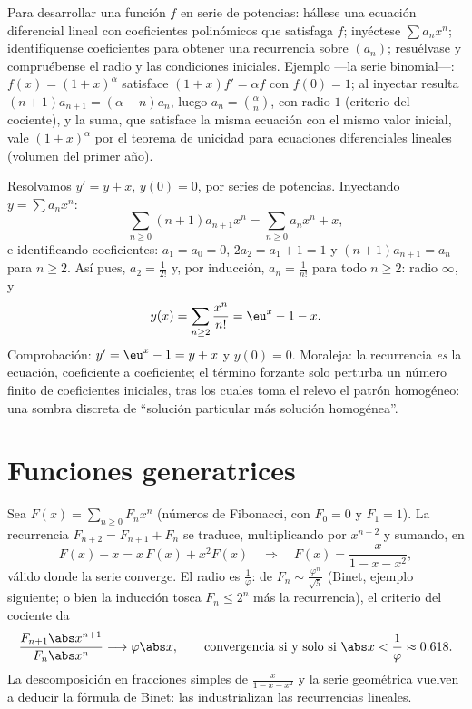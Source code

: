\begin{method}\label{met:b2:powerseries:ode}
Para desarrollar una función $f$ en serie de potencias: hállese una
ecuación diferencial lineal con coeficientes polinómicos que
satisfaga $f$; inyéctese $\sum a_nx^n$; identifíquense coeficientes
para obtener una recurrencia sobre $(a_n)$; resuélvase y
compruébense el radio y las condiciones iniciales. Ejemplo ---la
serie binomial---: $f(x) = (1+x)^\alpha$ satisface $(1+x)f' = \alpha
f$ con $f(0) = 1$; al inyectar resulta $(n+1)a_{n+1} = (\alpha -
n)a_n$, luego $a_n = \binom{\alpha}{n}$, con radio $1$ (criterio del
cociente), y la suma, que satisface la misma ecuación con el mismo
valor inicial, vale $(1 + x)^\alpha$ por el teorema de unicidad para
ecuaciones diferenciales lineales (volumen del primer año).
\end{method}

\begin{example}\label{ex:b2:powerseries:odeforced}
Resolvamos $y' = y + x$, $y(0) = 0$, por series de potencias.
Inyectando $y = \sum a_nx^n$:
\[
\sum_{n\geq0}(n+1)a_{n+1}x^n
= \sum_{n\geq0}a_nx^n + x ,
\]
e identificando coeficientes: $a_1 = a_0 = 0$, $2a_2 = a_1 + 1 = 1$
y $(n+1)a_{n+1} = a_n$ para $n \geq 2$. Así pues, $a_2 =
\frac{1}{2!}$ y, por inducción, $a_n = \frac{1}{n!}$ para todo $n
\geq 2$: radio $\infty$, y
\[
y(x) = \sum_{n\geq2}\frac{x^n}{n!} = \eu^x - 1 - x .
\]
Comprobación: $y' = \eu^x - 1 = y + x$ y $y(0) = 0$. Moraleja: la
recurrencia \emph{es} la ecuación, coeficiente a coeficiente; el
término forzante solo perturba un número finito de coeficientes
iniciales, tras los cuales toma el relevo el patrón homogéneo: una
sombra discreta de ``solución particular más solución homogénea''.
\end{example}

\section{Funciones generatrices}

\begin{example}[Fibonacci]\label{ex:b2:powerseries:fibonacci}
Sea $F(x) = \sum_{n\geq0} F_n x^n$ (números de Fibonacci, con $F_0 =
0$ y $F_1 = 1$). La recurrencia $F_{n+2} = F_{n+1} + F_n$ se
traduce, multiplicando por $x^{n+2}$ y sumando, en
\[
F(x) - x = x\,F(x) + x^2 F(x)
\quad\Longrightarrow\quad
F(x) = \frac{x}{1 - x - x^2} ,
\]
válido donde la serie converge. El radio es $\frac{1}{\varphi}$: de
$F_n \sim \frac{\varphi^n}{\sqrt5}$ (Binet, ejemplo siguiente; o
bien la inducción tosca $F_n \leq 2^n$ más la recurrencia), el
criterio del cociente da
\[
\frac{F_{n+1}\abs x^{n+1}}{F_n\abs x^n}
\longrightarrow \varphi\abs x ,
\qquad\text{convergencia si y solo si } \abs x < \frac1\varphi
\approx 0.618 .
\] La descomposición en fracciones simples de
$\frac{x}{1 - x - x^2}$ y la serie geométrica vuelven a deducir la
fórmula de Binet: las  industrializan las
recurrencias lineales.
\end{example}

